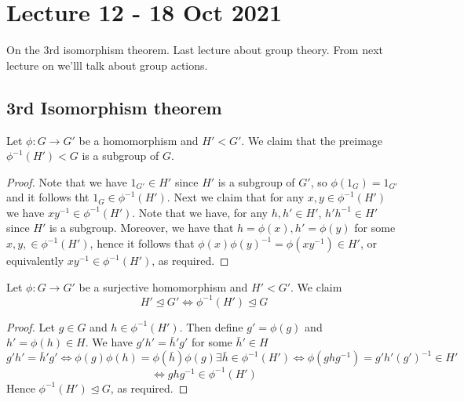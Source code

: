 \section{Lecture 12 - 18 Oct 2021}
On the 3rd isomorphism theorem. Last lecture about group theory. From next lecture on
we'lll talk about group actions. 
\subsection{3rd Isomorphism theorem}
\begin{lemma}[Sheet 2, Q5]
  Let $\phi:G\to G'$ be a homomorphism and $H'<G'$. We claim that the preimage
  $\phi^{-1}(H')<G$ is a subgroup of $G$. 
  \label{lem:preImgSubgroup}
\end{lemma}
\begin{proof}
  Note that we have $1_{G'}\in H'$ since $H'$ is a subgroup of $G'$, so
  $\phi(1_{G})=1_{G'}$ and it follows tht $1_{G}\in \phi^{-1}(H')$. Next we claim that for
  any $x,y\in\phi^{-1}(H')$ we have $xy^{-1}\in\phi^{-1}(H')$. Note that we have, for any
  $h,h'\in H'$, $h'h^{-1}\in H'$ since $H'$ is a subgroup. Moreover, we have that
  $h=\phi(x),h'=\phi(y)$ for some $x,y,\in\phi^{-1}(H')$, hence it follows that
  $\phi(x)\phi(y)^{-1} = \phi(xy^{-1})\in H'$, or equivalently $xy^{-1}\in\phi^{-1}(H')$,
  as required.
\end{proof}

\begin{lemma}
  Let $\phi:G\to G'$ be a surjective homomorphism and $H'<G'$. We claim 
  \[H'\trianglelefteq G' \iff \phi^{-1}(H')\trianglelefteq G\]
  \label{lem:preImgNormSub}
\end{lemma}
\begin{proof}
  Let $g\in G$ and $h\in \phi^{-1}(H')$. Then define $g'=\phi(g)$ and $h'=\phi(h)\in H$.
  We have $g'h' = \bar{h}'g'$ for some $\bar{h}'\in H$
  \[g'h' = \bar{h}'g' \iff \phi(g)\phi(h)  =\phi(\bar{h})\phi(g) \exists
  \bar{h}\in\phi^{-1}(H') \iff \phi(ghg^{-1}) = g'h'(g')^{-1} \in H'\]
  \[\iff ghg^{-1}\in \phi^{-1}(H')\]
  Hence $\phi^{-1}(H')\trianglelefteq G$, as required.
\end{proof}

